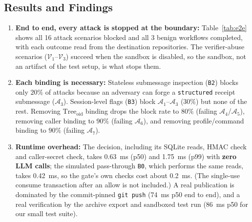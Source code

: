 \documentclass[sigconf,nonacm]{acmart}
\begin{document}
\subsection{Results and Findings}
\begin{enumerate}
  \item \textbf{End to end, every attack is stopped at the boundary:} Table~\ref{tab:e2e} shows all 16 attack scenarios blocked and all 3 benign workflows completed, with each outcome read from the destination repositories. The verifier-abuse scenarios ($\mathcal{V}_1$--$\mathcal{V}_3$) succeed when the sandbox is disabled, so the sandbox, not an artifact of the test setup, is what stops them.
  \item \textbf{Each binding is necessary:} Stateless submessage inspection (\texttt{B2}) blocks only $20\%$ of attacks because an adversary can forge a \texttt{structured} receipt submessage ($\mathcal{A}_3$). Session-level flags (\texttt{B3}) block $\mathcal{A}_1$--$\mathcal{A}_3$ ($30\%$) but none of the rest. Removing $\text{Tree}_{\text{oid}}$ binding drops the block rate to $80\%$ (failing $\mathcal{A}_4$/$\mathcal{A}_5$), removing caller binding to $90\%$ (failing $\mathcal{A}_6$), and removing profile/command binding to $90\%$ (failing $\mathcal{A}_7$).
  \item \textbf{Runtime overhead:} The decision, including its SQLite reads, HMAC check and caller-secret check, takes 0.63~ms (p50) and 1.75~ms (p99) with \textbf{zero LLM calls}; the simulated pass-through \texttt{B0}, which performs the same reads, takes 0.42~ms, so the gate's own checks cost about 0.2~ms. (The single-use consume transaction after an allow is not included.) A real publication is dominated by the commit-pinned \texttt{git push} (74~ms p50 end to end), and a real verification by the archive export and sandboxed test run (86~ms p50 for our small test suite).

\end{enumerate}
\end{document}
